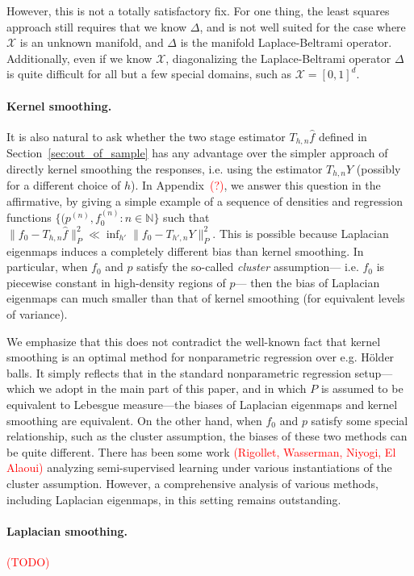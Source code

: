 \documentclass{article}
\newcommand{\1}{\mathbf{1}}
\newcommand{\mc}[1]{\mathcal{#1}}
\newcommand{\wh}[1]{\widehat{#1}}
\theoremstyle{alden}
\theoremstyle{aldenthm}
\theoremstyle{definition}
\theoremstyle{remark}
\begin{document}
However, this is not a totally satisfactory fix. For one thing, the least squares approach still requires that we know $\Delta$, and is not well suited for the case where $\mc{X}$ is an unknown manifold, and $\Delta$ is the manifold Laplace-Beltrami operator. Additionally, even if we know $\mc{X}$, diagonalizing the Laplace-Beltrami operator $\Delta$ is quite difficult for all but a few special domains, such as $\mc{X} = [0,1]^d$. 

\paragraph{Kernel smoothing.}
It is also natural to ask whether the two stage estimator $T_{h,n}\wh{f}$ defined in Section~\ref{sec:out_of_sample} has any advantage over the simpler approach of directly kernel smoothing the responses, i.e. using the estimator $T_{h,n}Y$ (possibly for a different choice of $h$). In Appendix~\textcolor{red}{(?)}, we answer this question in the affirmative, by giving a simple example of a sequence of densities and regression functions $\{(p^{(n)}, f_0^{(n)}: n \in \mathbb{N}\}$ such that $\|f_0 - T_{h,n}\wh{f}\|_P^2 \ll \inf_{h'} \|f_0 - T_{h',n}Y\|_P^2$. This is possible because Laplacian eigenmaps induces a completely different bias than kernel smoothing. In particular, when $f_0$ and $p$ satisfy the so-called \emph{cluster} assumption--- i.e. $f_0$ is piecewise constant in high-density regions of $p$--- then the bias of Laplacian eigenmaps can much smaller than that of kernel smoothing (for equivalent levels of variance). 

We emphasize that this does not contradict the well-known fact that kernel smoothing is an optimal method for nonparametric regression over e.g. H\"{o}lder balls. It simply reflects that in the standard nonparametric regression setup---which we adopt in the main part of this paper, and in which $P$ is assumed to be equivalent to Lebesgue measure---the biases of Laplacian eigenmaps and kernel smoothing are equivalent. On the other hand, when $f_0$ and $p$ satisfy some special relationship, such as the cluster assumption, the biases of these two methods can be quite different. There has been some work \textcolor{red}{(Rigollet, Wasserman, Niyogi, El Alaoui)} analyzing semi-supervised learning under various instantiations of the cluster assumption. However, a comprehensive analysis of various methods, including Laplacian eigenmaps, in this setting remains outstanding.

\paragraph{Laplacian smoothing.}
\textcolor{red}{(TODO)}
\end{document}

